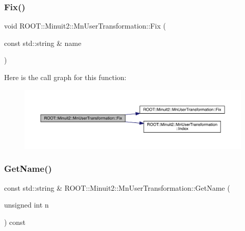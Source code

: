 \mbox{\label{classROOT_1_1Minuit2_1_1MnUserTransformation_ad01d6c104e0c4a26c2ebb34db0ba1752}} 
\subsubsection{\texorpdfstring{Fix()}{Fix()}\hspace{0.1cm}{\footnotesize\ttfamily [6/6]}}
{\footnotesize\ttfamily void R\+O\+O\+T\+::\+Minuit2\+::\+Mn\+User\+Transformation\+::\+Fix (\begin{DoxyParamCaption}\item[{const std\+::string \&}]{name }\end{DoxyParamCaption})}

Here is the call graph for this function\+:
\nopagebreak
\begin{figure}[H]
\begin{center}
\leavevmode
\includegraphics[width=350pt]{d9/d98/classROOT_1_1Minuit2_1_1MnUserTransformation_ad01d6c104e0c4a26c2ebb34db0ba1752_cgraph}
\end{center}
\end{figure}
\mbox{\label{classROOT_1_1Minuit2_1_1MnUserTransformation_aa9cb2ec1cc12b7aec1160394bb95833d}} 
\subsubsection{\texorpdfstring{GetName()}{GetName()}\hspace{0.1cm}{\footnotesize\ttfamily [1/3]}}
{\footnotesize\ttfamily const std\+::string \& R\+O\+O\+T\+::\+Minuit2\+::\+Mn\+User\+Transformation\+::\+Get\+Name (\begin{DoxyParamCaption}\item[{unsigned int}]{n }\end{DoxyParamCaption}) const}

